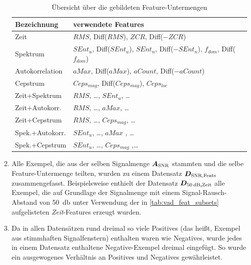 \begin{enumerate}
\begin{table}[h]
\centering
\caption{Übersicht über die gebildeten Feature-Untermengen}
\label{tab:vad_feat_subsets}
\begin{tabular}{@{}ll@{}}
\toprule
Bezeichnung & verwendete Features                                                              \\ \midrule
Zeit                     & $RMS$, Diff($RMS$), $ZCR$, Diff($-ZCR$)                                                  \\
Spektrum                 & $SEnt_u$, Diff($SEnt_u$), $SEnt_n$, Diff($-SEnt_n$), $f_{dom}$, Diff($f_{dom}$) \\
Autokorrelation          & $aMax$, Diff($aMax$), $aCount$, Diff($-aCount$)                                          \\
Cepstrum                 & $Ceps_{mag}$, Diff($Ceps_{mag}$), $Ceps_{loc}$                                   \\
Zeit+Spektrum            & $RMS$, \ldots , $SEnt_u$, \ldots                                                   \\
Zeit+Autokorr.           & $RMS$, \ldots , $aMax$, \ldots                                                       \\
Zeit+Cepstrum            & $RMS$, \ldots , $Ceps_{mag}$, \ldots                                               \\
Spek.+Autokorr.          & $SEnt_u$, \ldots , $aMax$ , \ldots                                                 \\
Spek.+Cepstrum           & $SEnt_u$, \ldots, $Ceps_{mag}$ ,\ldots                                           \\ \bottomrule
\end{tabular}
\end{table}

\item Alle Exempel, die aus der selben Signalmenge $\boldmath{A_{\text{SNR}}}$ stammten und die selbe Feature-Untermenge teilten, wurden zu einem Datensatz $\boldmath{D_{\text{SNR,Feats}}}$ zusammengefasst. Beispielsweise enthielt der Datensatz $\boldmath{D_{\SI{50}{\decibel},\text{Zeit}}}$ alle Exempel, die auf Grundlage der Signalmenge mit einem Signal-Rausch-Abstand von \SI{50}{\decibel} unter Verwendung der in \autoref{tab:vad_feat_subsets} aufgelisteten \emph{Zeit}-Features erzeugt wurden.
\item Da in allen Datensätzen rund dreimal so viele Positives (das heißt, Exempel aus stimmhaften Signalfenstern) enthalten waren wie Negatives, wurde jedes in einem Datensatz enthaltene Negative-Exempel dreimal eingefügt. So wurde ein ausgewogenes Verhältnis an Positives und Negatives gewährleistet.
\end{enumerate}

